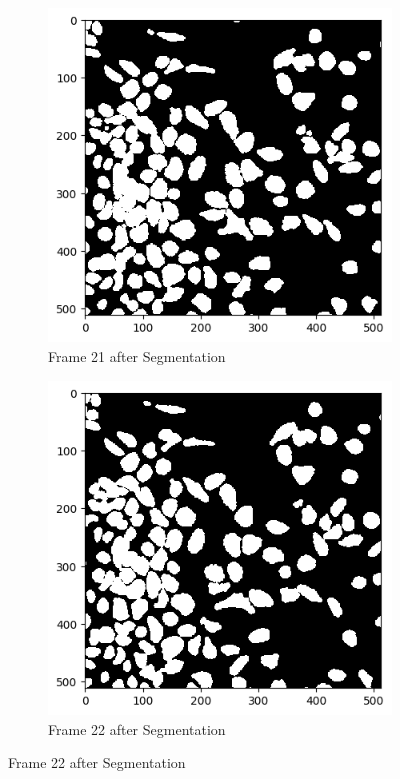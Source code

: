\documentclass{article}
\begin{document}
\begin{figure}[h!]
  \begin{subfigure}{0.4\textwidth}
    \includegraphics[width=\linewidth]{Report/Appendix_Images/Segmentation-A-Control/frame_21.png}
    \caption*{Frame 21 after Segmentation}
  \end{subfigure}
  \hfill
  \begin{subfigure}{0.4\textwidth}
    \includegraphics[width=\linewidth]{Report/Appendix_Images/Segmentation-A-Control/frame_22.png}
    \caption*{Frame 22 after Segmentation}
  \end{subfigure}


\end{figure}
\end{document}
